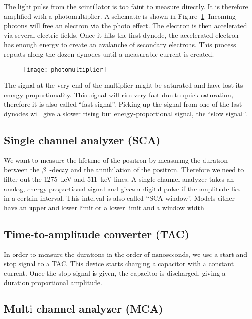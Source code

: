 \documentclass[11pt, english, fleqn, DIV=15, headinclude, BCOR=2cm]{scrreprt}
\begin{document}
The light pulse from the scintillator is too faint to measure directly. It is
therefore amplified with a photomultiplier. A schematic is shown in
Figure~\ref{fig:photomultiplier}. Incoming photons will free an electron via
the photo effect. The electron is then accelerated via several electric fields.
Once it hits the first dynode, the accelerated electron has enough energy to
create an avalanche of secondary electrons. This process repeats along the
dozen dynodes until a measurable current is created.

\begin{figure}
    \centering
    \texttt{[image: photomultiplier]}
    \caption{%
    }
    \label{fig:photomultiplier}
\end{figure}

The signal at the very end of the multiplier might be saturated and have lost
its energy proportionality. This signal will rise very fast due to quick
saturation, therefore it is also called \enquote{fast signal}. Picking up the
signal from one of the last dynodes will give a slower rising but
energy-proportional signal, the \enquote{slow signal}.

\subsection{Single channel analyzer (SCA)}

We want to measure the lifetime of the positron by measuring the duration
between the $\beta^+$-decay and the annihilation of the positron. Therefore we
need to filter out the \SI{1275}{\kilo\electronvolt} and
\SI{511}{\kilo\electronvolt} lines. A single channel analyzer takes an analog,
energy proportional signal and gives a digital pulse if the amplitude lies in a
certain interval. This interval is also called \enquote{SCA window}. Models
either have an upper and lower limit or a lower limit and a window width.

\subsection{Time-to-amplitude converter (TAC)}

In order to measure the durations in the order of nanoseconds, we use a start
and stop signal to a TAC\@. This device starts charging a capacitor with a
constant current. Once the stop-signal is given, the capacitor is discharged,
giving a duration proportional amplitude.

\subsection{Multi channel analyzer (MCA)}
\end{document}
